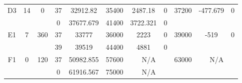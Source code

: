 \begin{sidewaystable}
\begin{tabular}{c||c|c||c|c|c|c|c||c|c|c}
         &
        
      \\
      \hline
      \multirow{2}{*}{D3} &
      \multirow{2}{*}{14} &
      \multirow{2}{*}{0} &
      37 &
      32912.82 &
      35400 &
        2487.18 &
        0 &
      \multirow{2}{*}{37200} &
        \multirow{2}{*}{-477.679} &
        \multirow{2}{*}{0}
      \\
      \cline{4-8}
       &
       &
       &
      0 &
      37677.679 &
      41400 &
        3722.321 &
        0 &
      
         &
        
      \\
      \hline
      \multirow{2}{*}{E1} &
      \multirow{2}{*}{7} &
      \multirow{2}{*}{360} &
      37 &
      33777 &
      36000 &
        2223 &
        0 &
      \multirow{2}{*}{39000} &
        \multirow{2}{*}{-519} &
        \multirow{2}{*}{0}
      \\
      \cline{4-8}
       &
       &
       &
      39 &
      39519 &
      44400 &
        4881 &
        0 &
      
         &
        
      \\
      \hline
      \multirow{2}{*}{F1} &
      \multirow{2}{*}{0} &
      \multirow{2}{*}{120} &
      37 &
      50982.855 &
      57600 &
        \multicolumn{2}{|c||}{N/A} &
      \multirow{2}{*}{63000} &
        \multicolumn{2}{c}{\multirow{2}{*}{N/A}}
      \\
      \cline{4-8}
       &
       &
       &
      0 &
      61916.567 &
      75000 &
        \multicolumn{2}{|c||}{N/A} &
      
        
      \\
\end{tabular}
\label{table:RDS1.txt-1582.tex} 
\end{sidewaystable}